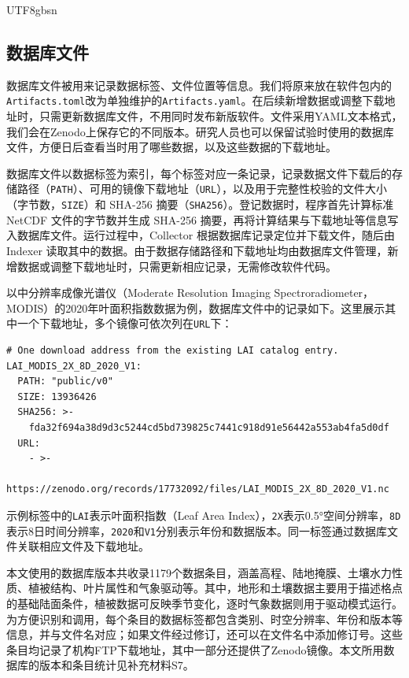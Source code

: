\documentclass[numdoi]{chinese}
\begin{document}
\begin{CJK}{UTF8}{gbsn}
\subsection{数据库文件}

数据库文件被用来记录数据标签、\allowbreak{}文件位置等信息。我们将原来放在软件包内的\nolinkurl{Artifacts.toml}改为单独维护的\nolinkurl{Artifacts.yaml}。在后续新增数据或调整下载地址时，只需更新数据库文件，不用同时发布新版软件。文件采用YAML文本格式，我们会在Zenodo上保存它的不同版本。研究人员也可以保留试验时使用的数据库文件，方便日后查看当时用了哪些数据，以及这些数据的下载地址。

数据库文件以数据标签为索引，每个标签对应一条记录，记录数据文件下载后的存储路径（\nolinkurl{PATH}）、可用的镜像下载地址（\nolinkurl{URL}），以及用于完整性校验的文件大小（字节数，\nolinkurl{SIZE}）和 SHA-256 摘要（\nolinkurl{SHA256}）。登记数据时，程序首先计算标准 NetCDF 文件的字节数并生成 SHA-256 摘要，再将计算结果与下载地址等信息写入数据库文件。运行过程中，Collector 根据数据库记录定位并下载文件，随后由 Indexer 读取其中的数据。由于数据存储路径和下载地址均由数据库文件管理，新增数据或调整下载地址时，只需更新相应记录，无需修改软件代码。

以中分辨率成像光谱仪（Moderate Resolution Imaging Spectroradiometer，MODIS）的2020年叶面积指数数据为例，数据库文件中的记录如下。这里展示其中一个下载地址，多个镜像可依次列在\nolinkurl{URL}下：

\begingroup\singlespacing
\begin{Verbatim}[fontsize=\small,frame=single,framesep=5pt]
# One download address from the existing LAI catalog entry.
LAI_MODIS_2X_8D_2020_V1:
  PATH: "public/v0"
  SIZE: 13936426
  SHA256: >-
    fda32f694a38d9d3c5244cd5bd739825c7441c918d91e56442a553ab4fa5d0df
  URL:
    - >-
      https://zenodo.org/records/17732092/files/LAI_MODIS_2X_8D_2020_V1.nc
\end{Verbatim}
\endgroup

示例标签中的\nolinkurl{LAI}表示叶面积指数（Leaf Area Index），\nolinkurl{2X}表示0.5°空间分辨率，\nolinkurl{8D}表示8日时间分辨率，\nolinkurl{2020}和\nolinkurl{V1}分别表示年份和数据版本。同一标签通过数据库文件关联相应文件及下载地址。

本文使用的数据库版本共收录1179个数据条目，涵盖高程、\allowbreak{}陆地掩膜、\allowbreak{}土壤水力性质、\allowbreak{}植被结构、\allowbreak{}叶片属性和气象驱动等。其中，地形和土壤数据主要用于描述格点的基础陆面条件，植被数据可反映季节变化，逐时气象数据则用于驱动模式运行。为方便识别和调用，每个条目的数据标签都包含类别、\allowbreak{}时空分辨率、\allowbreak{}年份和版本等信息，并与文件名对应；如果文件经过修订，还可以在文件名中添加修订号。这些条目均记录了机构FTP下载地址，其中一部分还提供了Zenodo镜像。本文所用数据库的版本和条目统计见补充材料S7。


\end{CJK}
\end{document}
